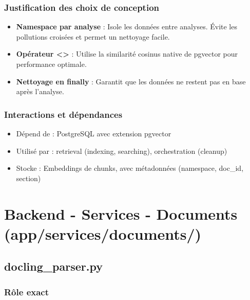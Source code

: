 \documentclass[12pt,a4paper,oneside]{book}
\begin{document}
\subsubsection{Justification des choix de conception}

\begin{itemize}
    \item \textbf{Namespace par analyse} : Isole les données entre analyses. Évite les pollutions croisées et permet un nettoyage facile.
    
    \item \textbf{Opérateur <>} : Utilise la similarité cosinus native de pgvector pour performance optimale.
    
    \item \textbf{Nettoyage en finally} : Garantit que les données ne restent pas en base après l'analyse.
\end{itemize}

\subsubsection{Interactions et dépendances}

\begin{itemize}
    \item Dépend de : PostgreSQL avec extension pgvector
    \item Utilisé par : retrieval (indexing, searching), orchestration (cleanup)
    \item Stocke : Embeddings de chunks, avec métadonnées (namespace, doc\_id, section)
\end{itemize}

\newpage


\section{Backend - Services - Documents (app/services/documents/)}

\subsection{docling\_parser.py}

\subsubsection{Rôle exact}
\end{document}
